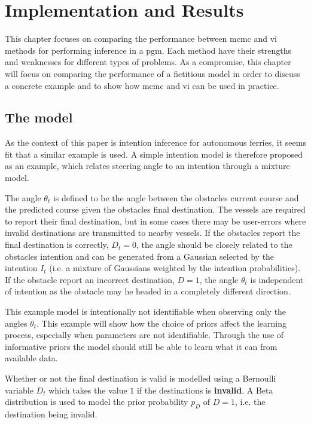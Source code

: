 \chapter{Implementation and Results}

This chapter focuses on comparing the performance between \acrshort{mcmc} and \acrshort{vi} methods for performing inference in a \acrshort{pgm}. Each method have their strengths and weaknesses for different types of problems. As a compromise, this chapter will focus on comparing the performance of a fictitious model in order to discuss a concrete example and to show how \acrshort{mcmc} and \acrshort{vi} can be used in practice.  

\section{The model}
As the context of this paper is intention inference for autonomous ferries, it seems fit that a similar example is used. A simple intention model is therefore proposed as an example, which relates steering angle to an intention through a mixture model. 

The angle $\theta_t$ is defined to be the angle between the obstacles current course and the predicted course given the obstacles final destination. The vessels are required to report their final destination, but in some cases there may be user-errors where invalid destinations are transmitted to nearby vessels. If the obstacles report the final destination is correctly, $D_t=0$, the angle should be closely related to the obstacles intention and can be generated from a Gaussian selected by the intention $I_t$ (i.e. a mixture of Gaussians weighted by the intention probabilities). If the obstacle report an incorrect destination, $D=1$, the angle $\theta_t$ is independent of intention as the obstacle may he headed in a completely different direction.

This example model is intentionally not identifiable when observing only the angles $\theta_t$. This example will show how the choice of priors affect the learning process, especially when parameters are not identifiable. Through the use of informative priors the model should still be able to learn what it can from available data.   

Whether or not the final destination is valid is modelled using a Bernoulli variable $D_t$ which takes the value $1$ if the destinations is \textbf{invalid}. A Beta distribution is used to model the prior probability $p_D$ of $D=1$, i.e. the destination being invalid.  

